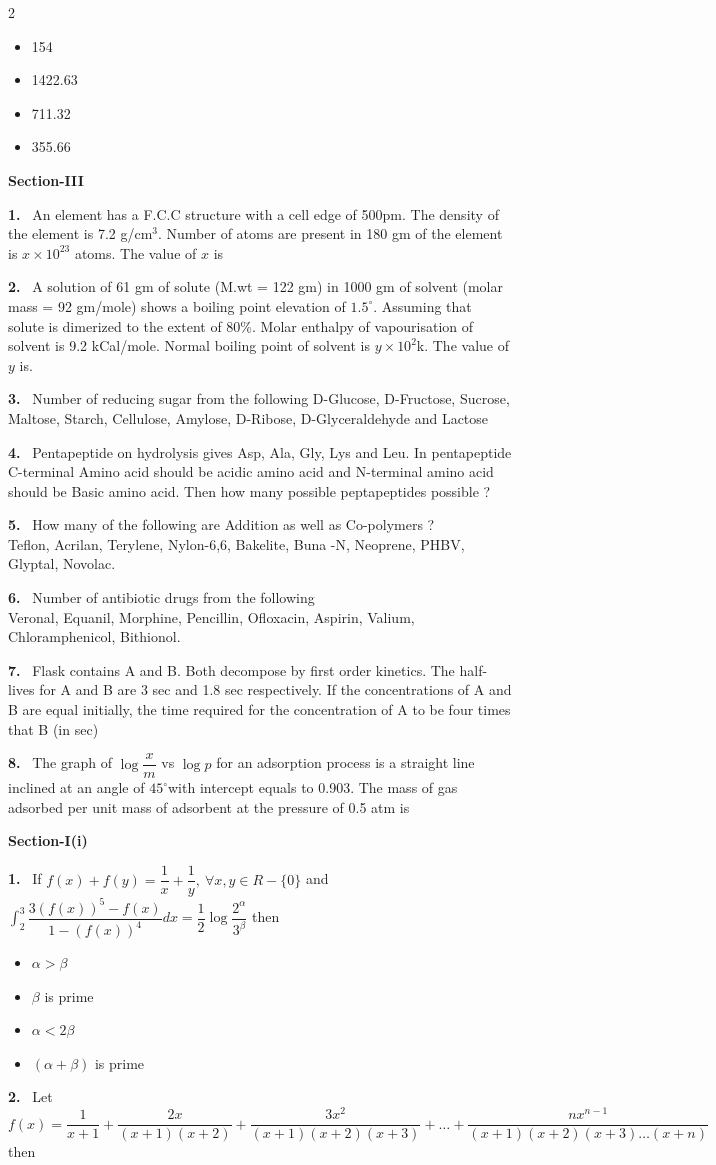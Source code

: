 \documentclass[10pt]{extarticle}
\newcommand{\partsec}[2]{\par\medskip\noindent{\large\bfseries PART-#1: #2}\par\smallskip}
\newcommand{\sect}[1]{\par\smallskip\noindent\textbf{#1}\par}
\newcommand{\qn}[1]{\par\smallskip\noindent\textbf{#1.}~}
\newenvironment{qoptions}{\begin{itemize}[leftmargin=1.8em,itemsep=1pt,topsep=2pt,label={}]}{\end{itemize}}
\newcommand{\opt}[2]{\item[(#1)] #2}
\begin{document}
\begin{multicols}{2}
\begin{qoptions}
\opt{A}{154}
\opt{B}{1422.63}
\opt{C}{711.32}
\opt{D}{355.66}
\end{qoptions}
\sect{Section-III}
\qn{1} An element has a F.C.C structure with a cell edge of 500pm. The density of the element is 7.2 g/cm$^3$. Number of atoms are present in 180 gm of the element is $x\times10^{23}$ atoms. The value of $x$ is
\qn{2} A solution of 61 gm of solute (M.wt = 122 gm) in 1000 gm of solvent (molar mass = 92 gm/mole) shows a boiling point elevation of $1.5^\circ$. Assuming that solute is dimerized to the extent of 80\%. Molar enthalpy of vapourisation of solvent is 9.2 kCal/mole. Normal boiling point of solvent is $y\times10^2$k. The value of $y$ is.
\qn{3} Number of reducing sugar from the following D-Glucose, D-Fructose, Sucrose, Maltose, Starch, Cellulose, Amylose, D-Ribose, D-Glyceraldehyde and Lactose
\qn{4} Pentapeptide on hydrolysis gives Asp, Ala, Gly, Lys and Leu. In pentapeptide C-terminal Amino acid should be acidic amino acid and N-terminal amino acid should be Basic amino acid. Then how many possible peptapeptides possible ?
\qn{5} How many of the following are Addition as well as Co-polymers ?\\
Teflon, Acrilan, Terylene, Nylon-6,6, Bakelite, Buna -N, Neoprene, PHBV, Glyptal, Novolac.
\qn{6} Number of antibiotic drugs from the following\\
Veronal, Equanil, Morphine, Pencillin, Ofloxacin, Aspirin, Valium, Chloramphenicol, Bithionol.
\qn{7} Flask contains A and B. Both decompose by first order kinetics. The half-lives for A and B are 3 sec and 1.8 sec respectively. If the concentrations of A and B are equal initially, the time required for the concentration of A to be four times that B (in sec)
\qn{8} The graph of $\log\dfrac xm$ vs $\log p$ for an adsorption process is a straight line inclined at an angle of $45^\circ$with intercept equals to 0.903. The mass of gas adsorbed per unit mass of adsorbent at the pressure of 0.5 atm is \underline{\hspace{1.5cm}}
\partsec{3}{MATHEMATICS}
\sect{Section-I(i)}
\qn{1} If $f(x)+f(y)=\dfrac1x+\dfrac1y,\ \forall x,y\in R-\{0\}$ and $\displaystyle\int_2^3\dfrac{3(f(x))^5-f(x)}{1-(f(x))^4}dx=\dfrac12\log\dfrac{2^\alpha}{3^\beta}$ then
\begin{qoptions}
\opt{A}{$\alpha>\beta$}
\opt{B}{$\beta$ is prime}
\opt{C}{$\alpha<2\beta$}
\opt{D}{$(\alpha+\beta)$ is prime}
\end{qoptions}
\qn{2} Let\\
$f(x)=\dfrac1{x+1}+\dfrac{2x}{(x+1)(x+2)}+\dfrac{3x^2}{(x+1)(x+2)(x+3)}+\ldots+\dfrac{nx^{n-1}}{(x+1)(x+2)(x+3)\ldots(x+n)}$ then

\end{multicols}
\end{document}
